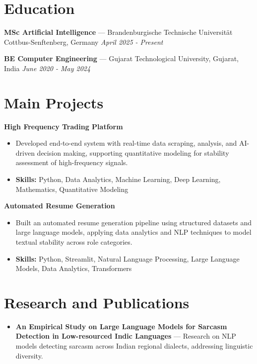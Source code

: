 \documentclass[a4paper,10pt]{article}
\begin{document}
\section*{Education}
\textbf{MSc Artificial Intelligence} — Brandenburgische Technische Universität Cottbus-Senftenberg, Germany \hfill \textit{April 2025 - Present}\par
\vspace{1.5pt}
\textbf{BE Computer Engineering} — Gujarat Technological University, Gujarat, India \hfill \textit{June 2020 - May 2024}\par

\section*{Main Projects}
\textbf{High Frequency Trading Platform}\par
\vspace{1pt}
\begin{itemize}
  \item Developed end-to-end system with real-time data scraping, analysis, and AI-driven decision making, supporting quantitative modeling for stability assessment of high-frequency signals.
  \item \textbf{Skills:} Python, Data Analytics, Machine Learning, Deep Learning, Mathematics, Quantitative Modeling
\end{itemize}
\vspace{3pt}
\textbf{Automated Resume Generation}\par
\vspace{1pt}
\begin{itemize}
  \item Built an automated resume generation pipeline using structured datasets and large language models, applying data analytics and NLP techniques to model textual stability across role categories.
  \item \textbf{Skills:} Python, Streamlit, Natural Language Processing, Large Language Models, Data Analytics, Transformers
\end{itemize}

\section*{Research and Publications}
\begin{itemize}
\item \textbf{An Empirical Study on Large Language Models for Sarcasm Detection in Low-resourced Indic Languages} — Research on NLP models detecting sarcasm across Indian regional dialects, addressing linguistic diversity.
\end{itemize}
\end{document}
